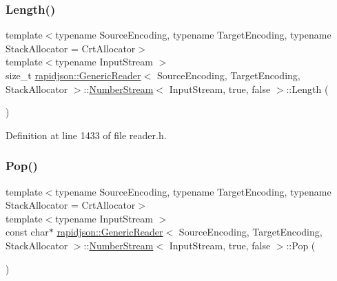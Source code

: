 \subsubsection{\texorpdfstring{Length()}{Length()}}
{\footnotesize\ttfamily template$<$typename Source\+Encoding, typename Target\+Encoding, typename Stack\+Allocator = Crt\+Allocator$>$ \\
template$<$typename Input\+Stream $>$ \\
size\+\_\+t \mbox{\hyperlink{classrapidjson_1_1_generic_reader}{rapidjson\+::\+Generic\+Reader}}$<$ Source\+Encoding, Target\+Encoding, Stack\+Allocator $>$\+::\mbox{\hyperlink{classrapidjson_1_1_generic_reader_1_1_number_stream}{Number\+Stream}}$<$ Input\+Stream, true, false $>$\+::Length (\begin{DoxyParamCaption}{ }\end{DoxyParamCaption})}



Definition at line 1433 of file reader.\+h.


\begin{DoxyCode}{0}

\end{DoxyCode}
\mbox{\label{classrapidjson_1_1_generic_reader_1_1_number_stream_3_01_input_stream_00_01true_00_01false_01_4_a66209b00a3fd8d0cdd044ceeabc125dc}} 
\subsubsection{\texorpdfstring{Pop()}{Pop()}}
{\footnotesize\ttfamily template$<$typename Source\+Encoding, typename Target\+Encoding, typename Stack\+Allocator = Crt\+Allocator$>$ \\
template$<$typename Input\+Stream $>$ \\
const char$\ast$ \mbox{\hyperlink{classrapidjson_1_1_generic_reader}{rapidjson\+::\+Generic\+Reader}}$<$ Source\+Encoding, Target\+Encoding, Stack\+Allocator $>$\+::\mbox{\hyperlink{classrapidjson_1_1_generic_reader_1_1_number_stream}{Number\+Stream}}$<$ Input\+Stream, true, false $>$\+::Pop (\begin{DoxyParamCaption}{ }\end{DoxyParamCaption})}



